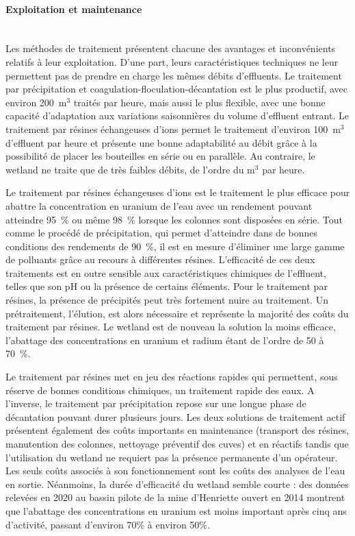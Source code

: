 \documentclass{article}
\begin{document}
\paragraph{Exploitation et maintenance \\ \\}

Les méthodes de traitement présentent chacune des avantages et inconvénients relatifs à leur exploitation. D’une part, leurs caractéristiques techniques ne leur permettent pas de prendre en charge les mêmes débits d’effluents. Le traitement par précipitation et coagulation-floculation-décantation est le plus productif, avec environ 200~$\text{m}^3$ traités par heure, mais aussi le plus flexible, avec une bonne capacité d’adaptation aux variations saisonnières du volume d’effluent entrant. Le traitement par résines échangeuses d’ions permet le traitement d’environ 100~$\text{m}^3$ d’effluent par heure et présente une bonne adaptabilité au débit grâce à la possibilité de placer les bouteilles en série ou en parallèle. Au contraire, le wetland ne traite que de très faibles débits, de l’ordre du $\text{m}^3$ par heure.

Le traitement par résines échangeuses d’ions est le traitement le plus efficace pour abattre la concentration en uranium de l’eau avec un rendement pouvant atteindre 95~\% ou même 98~\% lorsque les colonnes sont disposées en série.  Tout comme le procédé de précipitation, qui permet d’atteindre dans de bonnes conditions des rendements de 90~\%, il est en mesure d’éliminer une large gamme de polluants grâce au recours à différentes résines. L’efficacité de ces deux traitements est en outre sensible aux caractéristiques chimiques de l’effluent, telles que son pH ou la présence de certains éléments. Pour le traitement par résines, la présence de précipités peut très fortement nuire au traitement. Un prétraitement, l’élution, est alors nécessaire et représente la majorité des coûts du traitement par résines. Le wetland est de nouveau la solution la moins efficace, l’abattage des concentrations en uranium et radium étant de l’ordre de 50 à 70~\%.

Le traitement par résines met en jeu des réactions rapides qui permettent, sous réserve de bonnes conditions chimiques, un traitement rapide des eaux. A l’inverse, le traitement par précipitation repose sur une longue phase de décantation pouvant durer plusieurs jours. Les deux solutions de traitement actif présentent également des coûts importants en maintenance (transport des résines, manutention des colonnes, nettoyage préventif des cuves) et en réactifs tandis que l’utilisation du wetland ne requiert pas la présence permanente d’un opérateur. Les seuls coûts associés à son fonctionnement sont les coûts des analyses de l’eau en sortie.  Néanmoins, la durée d’efficacité du wetland semble courte : des données relevées en 2020 au bassin pilote de la mine d’Henriette ouvert en 2014 montrent que l’abattage des concentrations en uranium est moins important après cinq ans d’activité, passant d'environ 70\% à environ 50\%. %
\end{document}

